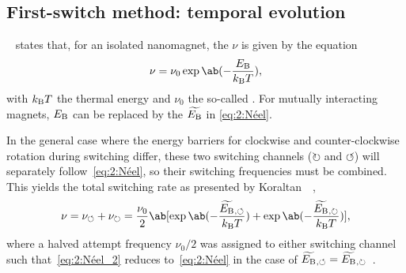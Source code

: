 \subsection{First-switch method: temporal evolution}
~\cite{neel1949theorie} states that, for an isolated nanomagnet, the  $\nu$ is given by the  equation
\begin{equation}
	\label{eq:2:Néel}
	\nu = \nu_0 \exp\ab(-\frac{\EB}{\kBT}) \mathrm{,}
\end{equation}
with $\kBT$ the thermal energy and $\nu_0$ the so-called .
For mutually interacting magnets, $E_\mathrm{B}$ can be replaced by the  $\widetilde{E_\mathrm{B}}$ in \cref{eq:2:Néel}. \par
In the general case where the energy barriers for clockwise and counter-clockwise rotation during switching differ, these two switching channels ($\circlearrowright$ and $\circlearrowleft$) will separately follow~\cref{eq:2:Néel}, so their switching frequencies must be combined.
This yields the total switching rate as presented by Koraltan~\etal~\cite{DirectionalEnergyBarrier},
\begin{equation}
	\label{eq:2:Néel_2}
	\nu = \nu_\circlearrowleft + \nu_\circlearrowright = \frac{\nu_0}{2} \ab[\exp\ab(-\frac{\EBeffLeft}{\kBT}) + \exp\ab(-\frac{\EBeffRight}{\kBT})] \mathrm{,}
\end{equation}
where a halved attempt frequency $\nu_0/2$ was assigned to either switching channel such that~\cref{eq:2:Néel_2} reduces to~\cref{eq:2:Néel} in the case of $\widetilde{E_\mathrm{B}}{}_{,\circlearrowleft}=\widetilde{E_\mathrm{B}}{}_{,\circlearrowright}$~\cite{leo2021chiral}.

